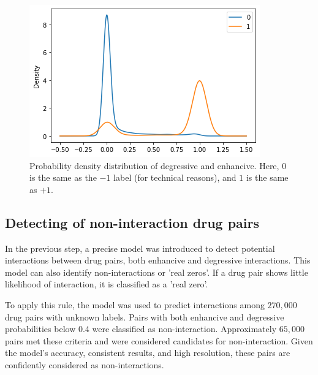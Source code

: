 \documentclass[unnumsec,webpdf,contemporary,large]{oup-authoring-template}%
\theoremstyle{thmstyleone}%
\theoremstyle{thmstyletwo}%
\theoremstyle{thmstylethree}%
\begin{document}
\begin{enumerate}
\begin{figure}[htp]
    \centering
    \includegraphics[scale=.5]{PredictonDensity(-1,+1)}
    \caption{Probability density distribution of degressive and enhancive. Here, 0 is the same as the $-1$ label (for technical reasons), and $1$ is the same as $+1$.}
    \label{preddensity}
\end{figure}
\end{enumerate}  
\subsection{Detecting of non-interaction drug pairs}
In the previous step, a precise model was introduced to detect potential interactions between drug pairs, both enhancive and degressive interactions. This model can also identify non-interactions or 'real zeros'. If a drug pair shows little likelihood of interaction, it is classified as a 'real zero'.

To apply this rule, the model was used to predict interactions among $270,000$ drug pairs with unknown labels. Pairs with both enhancive and degressive probabilities below 0.4 were classified as non-interaction. Approximately $65,000$ pairs met these criteria and were considered candidates for non-interaction. Given the model’s accuracy, consistent results, and high resolution, these pairs are confidently considered as non-interactions.
\end{document}
